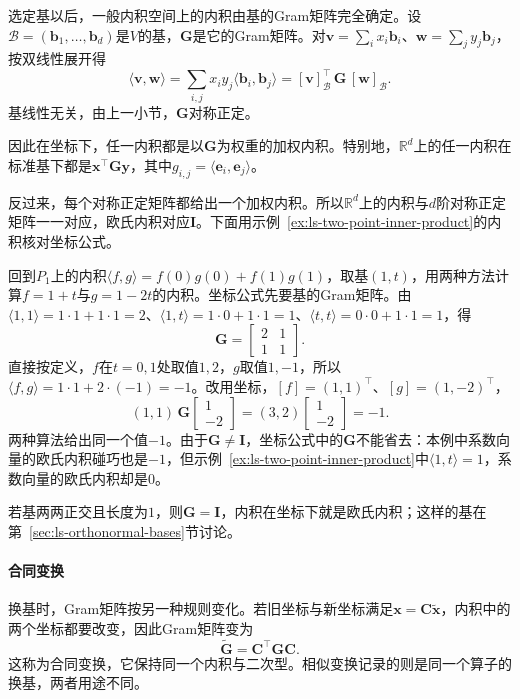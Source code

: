 选定基以后，一般内积空间上的内积由基的Gram矩阵完全确定。设$\mathcal B=(\bm b_1,\ldots,\bm b_d)$是$V$的基，$\bm G$是它的Gram矩阵。对$\bm v=\sum_ix_i\bm b_i$、$\bm w=\sum_jy_j\bm b_j$，按双线性展开得
\[
 \langle\bm v,\bm w\rangle=\sum_{i,j}x_iy_j\langle\bm b_i,\bm b_j\rangle=[\bm v]_{\mathcal B}^\top\,\bm G\,[\bm w]_{\mathcal B}.
\]
基线性无关，由上一小节，$\bm G$对称正定。

因此在坐标下，任一内积都是以$\bm G$为权重的加权内积。特别地，$\mathbb R^d$上的任一内积在标准基下都是$\bm x^\top\bm G\bm y$，其中$g_{i,j}=\langle\bm e_i,\bm e_j\rangle$。

反过来，每个对称正定矩阵都给出一个加权内积。所以$\mathbb R^d$上的内积与$d$阶对称正定矩阵一一对应，欧氏内积对应$\bm I$。下面用示例~\ref{ex:ls-two-point-inner-product}的内积核对坐标公式。
\begin{example}[两点内积的坐标计算]
\label{ex:ls-two-point-inner-product-coordinates}
回到$P_1$上的内积$\langle f,g\rangle=f(0)g(0)+f(1)g(1)$，取基$(1,t)$，用两种方法计算$f=1+t$与$g=1-2t$的内积。坐标公式先要基的Gram矩阵。由$\langle1,1\rangle=1\cdot1+1\cdot1=2$、$\langle1,t\rangle=1\cdot0+1\cdot1=1$、$\langle t,t\rangle=0\cdot0+1\cdot1=1$，得
\[
 \bm G=\begin{bmatrix}2&1\\1&1\end{bmatrix}.
\]
直接按定义，$f$在$t=0,1$处取值$1,2$，$g$取值$1,-1$，所以$\langle f,g\rangle=1\cdot1+2\cdot(-1)=-1$。改用坐标，$[f]=(1,1)^\top$、$[g]=(1,-2)^\top$，
\[
 (1,1)\,\bm G\begin{bmatrix}1\\-2\end{bmatrix}=(3,2)\begin{bmatrix}1\\-2\end{bmatrix}=-1 .
\]
两种算法给出同一个值$-1$。由于$\bm G\neq\bm I$，坐标公式中的$\bm G$不能省去：本例中系数向量的欧氏内积碰巧也是$-1$，但示例~\ref{ex:ls-two-point-inner-product}中$\langle1,t\rangle=1$，系数向量的欧氏内积却是$0$。
\end{example}
若基两两正交且长度为$1$，则$\bm G=\bm I$，内积在坐标下就是欧氏内积；这样的基在第~\ref{sec:ls-orthonormal-bases}节讨论。

\paragraph{合同变换} 
换基时，Gram矩阵按另一种规则变化。若旧坐标与新坐标满足$\bm x=\bm C\widetilde{\bm x}$，内积中的两个坐标都要改变，因此Gram矩阵变为
\[
 \widetilde{\bm G}=\bm C^\top\bm G\bm C.
\]
这称为合同变换，它保持同一个内积与二次型。相似变换记录的则是同一个算子的换基，两者用途不同。

